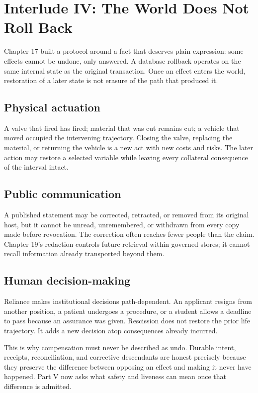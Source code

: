 \documentclass[11pt,openany]{book}
\newcommand{\interlude}{\cleardoublepage}
\begin{document}
\interlude
\chapter*{Interlude IV: The World Does Not Roll Back}
Chapter 17 built a protocol around a fact that deserves plain expression:
some effects cannot be undone, only answered. A database rollback operates on
the same internal state as the original transaction. Once an effect enters the
world, restoration of a later state is not erasure of the path that produced
it.

\section*{Physical actuation}
A valve that fired has fired; material that was cut remains cut; a vehicle
that moved occupied the intervening trajectory. Closing the valve, replacing
the material, or returning the vehicle is a new act with new costs and risks.
The later action may restore a selected variable while leaving every collateral
consequence of the interval intact.

\section*{Public communication}
A published statement may be corrected, retracted, or removed from its
original host, but it cannot be unread, unremembered, or withdrawn from every
copy made before revocation. The correction often reaches fewer people than
the claim. Chapter 19's redaction controls future retrieval within governed
stores; it cannot recall information already transported beyond them.

\section*{Human decision-making}
Reliance makes institutional decisions path-dependent. An applicant resigns
from another position, a patient undergoes a procedure, or a student allows a
deadline to pass because an assurance was given. Rescission does not restore
the prior life trajectory. It adds a new decision atop consequences already
incurred.

This is why compensation must never be described as undo. Durable intent,
receipts, reconciliation, and corrective descendants are honest precisely
because they preserve the difference between opposing an effect and making it
never have happened. Part V now asks what safety and liveness can mean once
that difference is admitted.
\end{document}
